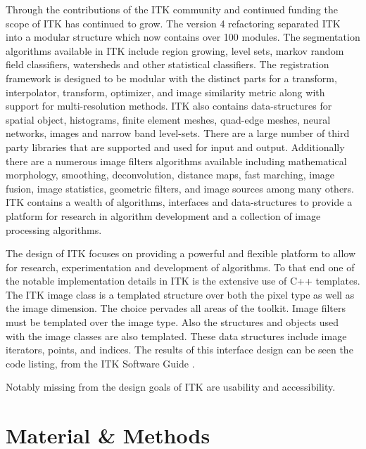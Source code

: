 \documentclass{frontiersMED} %
\begin{document}
Through the contributions of the ITK community and continued funding
the scope of ITK has continued to grow. The version 4 refactoring
separated ITK into a modular structure which now contains over 100
modules. The segmentation algorithms available in ITK include region
growing, level sets, markov random field classifiers, watersheds and
other statistical classifiers. The registration framework is designed
to be modular with the distinct parts for a transform, interpolator,
transform, optimizer, and image similarity metric along with support
for multi-resolution methods. ITK also contains data-structures for
spatial object, histograms, finite element meshes, quad-edge meshes,
neural networks, images and narrow band level-sets. There are a large
number of third party libraries that are supported and used for input
and output. Additionally there are a numerous image filters algorithms
available including mathematical morphology, smoothing, deconvolution,
distance maps, fast marching, image fusion, image statistics,
geometric filters, and image sources among many others. ITK contains a
wealth of algorithms, interfaces and data-structures to provide a
platform for research in algorithm development and a collection of
image processing algorithms.

The design of ITK focuses on providing a powerful and flexible
platform to allow for research, experimentation and development of
algorithms. To that end one of the notable implementation details in
ITK is the extensive use of C++ templates. The ITK image class is a
templated structure over both the pixel type as well as the image
dimension. The choice pervades all areas of the toolkit. Image filters
must be templated over the image type. Also the structures and objects
used with the image classes are also templated. These data structures
include image iterators, points, and indices. The results of this
interface design can be seen the code listing, from the ITK Software
Guide \cite{Ibanez2003}.



Notably missing from the design goals of ITK are usability and accessibility.





\section{Material \& Methods}
\end{document}
